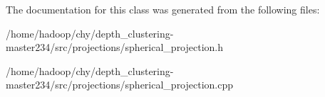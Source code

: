 The documentation for this class was generated from the following files\-:\begin{DoxyCompactItemize}
\item 
/home/hadoop/chy/depth\-\_\-clustering-\/master234/src/projections/spherical\-\_\-projection.\-h\item 
/home/hadoop/chy/depth\-\_\-clustering-\/master234/src/projections/spherical\-\_\-projection.\-cpp\end{DoxyCompactItemize}
